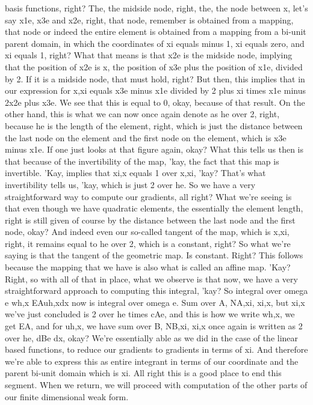 \documentclass[10pt]{article}
\begin{document}
basis functions, right? The, the midside node, right, the, the node between x, let's say x1e, x3e and x2e, right, that node, remember is obtained from a mapping, that node or indeed the entire element is obtained from a mapping from a bi-unit parent domain, in which the coordinates of xi equals minus 1, xi equals zero, and xi equals 1, right? What that means is that x2e is the midside node, implying that the position of x2e is x, the position of x3e plus the position of x1e, divided by 2. If it is a midside node, that must hold, right? But then, this implies that in our expression for x,xi equals x3e minus x1e divided by 2 plus xi times x1e minus 2x2e plus x3e. We see that this is equal to 0, okay, because of that result. On the other hand, this is what we can now once again denote as he over 2, right, because he is the length of the element, right, which is just the distance between the last node on the element and the first node on the element, which is x3e minus x1e. If one just looks at that figure again, okay? What this tells us then is that because of the invertibility of the map, 'kay, the fact that this map is invertible. 'Kay, implies that xi,x equals 1 over x,xi, 'kay? That's what invertibility tells us, 'kay, which is just 2 over he. So we have a very straightforward way to compute our gradients, all right? What we're seeing is that even though we have quadratic elements, the essentially the element length, right is still given of course by the distance between the last node and the first node, okay? And indeed even our so-called tangent of the map, which is x,xi, right, it remains equal to he over 2, which is a constant, right? So what we're saying is that the tangent of the geometric map. Is constant. Right? This follows because the mapping that we have is also what is called an affine map. 'Kay? Right, so with all of that in place, what we observe is that now, we have a very straightforward approach to computing this integral, 'kay? So integral over omega e wh,x EAuh,xdx now is integral over omega e. Sum over A, NA,xi, xi,x, but xi,x we've just concluded is 2 over he times cAe, and this is how we write wh,x, we get EA, and for uh,x, we have sum over B, NB,xi, xi,x once again is written as 2 over he, dBe dx, okay? We're essentially able as we did in the case of the linear based functions, to reduce our gradients to gradients in terms of xi. And therefore we're able to express this as entire integrant in terms of our coordinate and the parent bi-unit domain which is xi. All right this is a good place to end this segment. When we return, we will proceed with computation of the other parts of our finite dimensional weak form.
\end{document}
